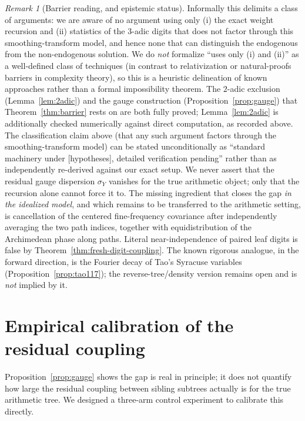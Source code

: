 \documentclass[11pt]{article}
\theoremstyle{definition}
\theoremstyle{remark}
\newtheorem{remark}[theorem]{Remark}
\begin{document}
\begin{remark}[Barrier reading, and epistemic status]\label{rem:barrier-reading}
Informally this delimits a class of arguments: we are aware of no
argument using only \textup{(i)} the exact weight recursion and
\textup{(ii)} statistics of the $3$-adic digits that does not factor
through this smoothing-transform model, and hence none that can
distinguish the endogenous from the non-endogenous solution. We do
\emph{not} formalize ``uses only (i) and (ii)'' as a well-defined class
of techniques (in contrast to relativization or natural-proofs barriers in
complexity theory), so this is a heuristic delineation of known
approaches rather than a formal impossibility theorem. The $2$-adic exclusion
(Lemma~\ref{lem:2adic}) and the gauge construction
(Proposition~\ref{prop:gauge}) that Theorem~\ref{thm:barrier} rests on
are both fully proved; Lemma~\ref{lem:2adic} is additionally checked
numerically against direct computation, as recorded above. The classification claim
above (that any such argument factors through the smoothing-transform
model) can be stated unconditionally as ``standard machinery under
[hypotheses], detailed verification pending'' rather than as
independently re-derived against our exact setup. We never assert that
the residual gauge dispersion $\sigma_Y$ vanishes for the true
arithmetic object; only that the recursion alone cannot force it to.
The missing ingredient that closes the gap \emph{in the idealized
model}, and which remains to be transferred to the arithmetic
setting, is cancellation of the centered fine-frequency covariance
after independently averaging the two path indices, together with
equidistribution of the Archimedean phase along paths. Literal
near-independence of paired leaf digits is false by
Theorem~\ref{thm:fresh-digit-coupling}. The known
rigorous analogue, in the forward direction, is the Fourier decay of
Tao's Syracuse variables (Proposition~\ref{prop:tao117}); the
reverse-tree/density version remains open and is \emph{not} implied by
it.
\end{remark}

\section{Empirical calibration of the residual coupling}
\label{sec:calibration}

Proposition~\ref{prop:gauge} shows the gap is real in principle; it
does not quantify how large the residual coupling between sibling
subtrees actually is for the true arithmetic tree. We designed a
three-arm control experiment to calibrate this directly.
\end{document}
